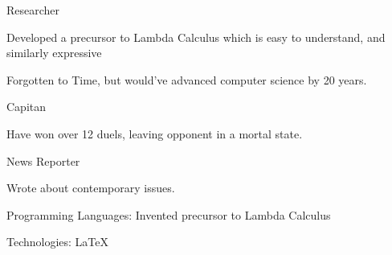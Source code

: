 \documentclass{practical-resume}
\begin{document}
	\begin{position}{Researcher}{}
	\item Developed a precursor to Lambda Calculus which is easy to understand, and similarly expressive
	\item Forgotten to Time, but would've advanced computer science by 20 years.
	\end{position}
	
	\begin{position}{Capitan}{}
	\item Have won over 12 duels, leaving opponent in a mortal state.
	\end{position}
	
		
	\begin{position}{News Reporter}{}
	 \item Wrote about contemporary issues.
	 \end{position}

\vspace{-1em}
	Programming Languages: Invented precursor to Lambda Calculus
	
	Technologies: \LaTeX
\end{document}
